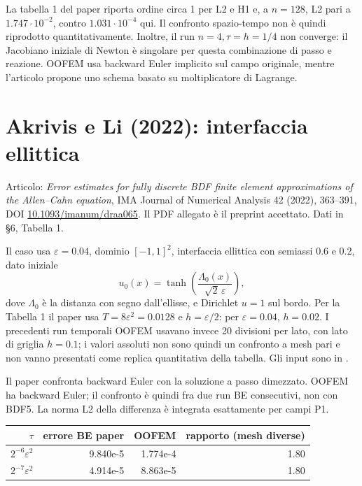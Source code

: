\documentclass[10pt,a4paper]{article}
\begin{document}
La tabella 1 del paper riporta ordine circa 1 per L2 e H1 e, a \(n=128\), L2 pari a \(1.747\cdot10^{-2}\), contro \(1.031\cdot10^{-4}\) qui. Il confronto spazio-tempo non è quindi riprodotto quantitativamente. Inoltre, il run \(n=4,\tau=h=1/4\) non converge: il Jacobiano iniziale di Newton è singolare per questa combinazione di passo e reazione. OOFEM usa backward Euler implicito sul campo originale, mentre l'articolo propone uno schema basato su moltiplicatore di Lagrange.

\section{Akrivis e Li (2022): interfaccia ellittica}
Articolo: \emph{Error estimates for fully discrete BDF finite element approximations of the Allen--Cahn equation}, IMA Journal of Numerical Analysis 42 (2022), 363--391, DOI \href{https://doi.org/10.1093/imanum/draa065}{10.1093/imanum/draa065}. Il PDF allegato è il preprint accettato. Dati in §6, Tabella 1.

Il caso usa \(\varepsilon=0.04\), dominio \([-1,1]^2\), interfaccia ellittica con semiassi 0.6 e 0.2, dato iniziale
\[
 u_0(x)=\tanh\!\left(\frac{\Lambda_0(x)}{\sqrt{2}\,\varepsilon}\right),
\]
dove \(\Lambda_0\) è la distanza con segno dall'ellisse, e Dirichlet \(u=1\) sul bordo. Per la Tabella 1 il paper usa \(T=8\varepsilon^2=0.0128\) e \(h=\varepsilon/2\): per \(\varepsilon=0.04\), \(h=0.02\). I precedenti run temporali OOFEM usavano invece 20 divisioni per lato, con lato di griglia \(h=0.1\); i valori assoluti non sono quindi un confronto a mesh pari e non vanno presentati come replica quantitativa della tabella. Gli input sono in .

Il paper confronta backward Euler con la soluzione a passo dimezzato. OOFEM ha backward Euler; il confronto è quindi fra due run BE consecutivi, non con BDF5. La norma L2 della differenza è integrata esattamente per campi P1.

\begin{center}\small
\begin{tabular}{r r r r}
\toprule
\(\tau\) & errore BE paper & OOFEM & rapporto (mesh diverse) \\
\midrule
\(2^{-6}\varepsilon^2\) & 9.840e-5 & 1.774e-4 & 1.80 \\
\(2^{-7}\varepsilon^2\) & 4.914e-5 & 8.863e-5 & 1.80 \\
\bottomrule
\end{tabular}
\end{center}
\end{document}
